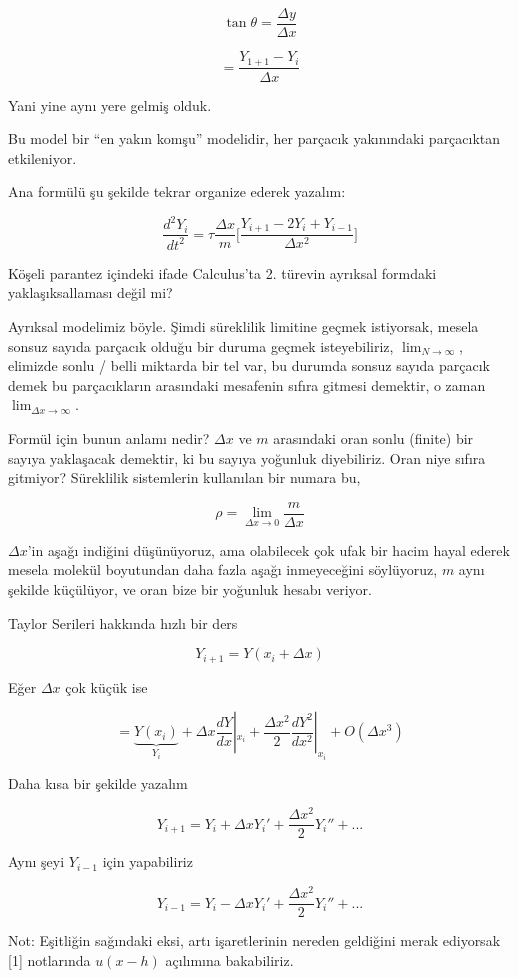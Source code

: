 \documentclass[12pt,fleqn]{article}\usepackage{../../common}
\begin{document}
$$  \tan\theta = \frac{\Delta y}{\Delta x} $$

$$ = \frac{Y_{1+1}-Y_i}{\Delta x} $$

Yani yine aynı yere gelmiş olduk. 

Bu model bir ``en yakın komşu'' modelidir, her parçacık yakınındaki
parçacıktan etkileniyor. 

Ana formülü şu şekilde tekrar organize ederek yazalım:

$$ \frac{d^2Y_i}{dt^2} = 
\tau \frac{\Delta x}{m} \bigg[
\frac{Y_{i+1} - 2Y_i + Y_{i-1}}{\Delta x^2}
\bigg]
$$

Köşeli parantez içindeki ifade Calculus'ta 2. türevin ayrıksal formdaki
yaklaşıksallaması değil mi?

Ayrıksal modelimiz böyle. Şimdi süreklilik limitine geçmek istiyorsak,
mesela sonsuz sayıda parçacık olduğu bir duruma geçmek isteyebiliriz,
$\lim_{N \to \infty}$, elimizde sonlu / belli miktarda bir tel var, bu durumda 
sonsuz sayıda parçacık demek bu parçacıkların arasındaki mesafenin sıfıra 
gitmesi demektir, o zaman $\lim_{\Delta x \to \infty}$. 

Formül için bunun anlamı nedir? $\Delta x$ ve $m$ arasındaki oran sonlu
(finite) bir sayıya yaklaşacak demektir, ki bu sayıya yoğunluk
diyebiliriz. Oran niye sıfıra gitmiyor? Süreklilik sistemlerin kullanılan
bir numara bu,

$$ \rho = \lim_{\Delta x \to 0} \frac{m}{\Delta x} $$

$\Delta x$'in aşağı indiğini düşünüyoruz, ama olabilecek çok ufak bir hacim
hayal ederek mesela molekül boyutundan daha fazla aşağı inmeyeceğini
söylüyoruz, $m$ aynı şekilde küçülüyor, ve oran bize bir yoğunluk hesabı
veriyor.

Taylor Serileri hakkında hızlı bir ders

$$ Y_{i+1}=Y(x_i + \Delta x) $$

Eğer $\Delta x$ çok küçük ise

$$ = 
\underbrace{Y(x_i)}_{Y_i} + \Delta x \frac{dY}{dx}|_{x_i} + 
\frac{\Delta x^2}{2}\frac{dY^2}{dx^2}|_{x_i} + 
O(\Delta x^3)
$$

Daha kısa bir şekilde yazalım

$$ Y_{i+1} = Y_i + \Delta x Y_i' + \frac{\Delta x^2}{2}Y_i'' + ... 
$$

Aynı şeyi $Y_{i-1}$ için yapabiliriz

$$ Y_{i-1} = Y_i - \Delta x Y_i' + \frac{\Delta x^2}{2}Y_i'' + ... 
$$

Not: Eşitliğin sağındaki eksi, artı işaretlerinin nereden geldiğini merak
ediyorsak [1] notlarında $u(x-h)$ açılımına bakabiliriz.
\end{document}
